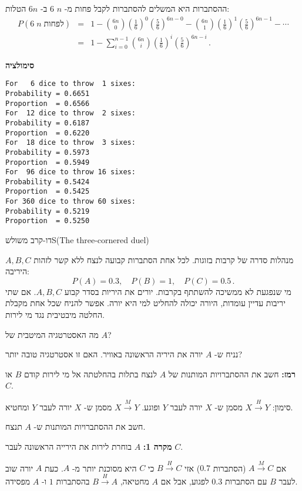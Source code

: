 ההסתברות היא המשלים להסתברות לקבל פחות מ-%
$n$ $6$
ב-%
$6n$
הטלות:
\begin{eqnarray*}
P(6\; n\;\textrm{לפחות})&=&
  1-{6n \choose 0}\left(\frac{1}{6}\right)^0\left(\frac{5}{6}\right)^{6n-0}-
  {6n\choose 1}\left(\frac{1}{6}\right)^{1}\left(\frac{5}{6}\right)^{6n-1}-\cdots\\
&=&1-\sum_{i=0}^{n-1}{6n\choose i}\left(\frac{1}{6}\right)^{i}\left(\frac{5}{6}\right)^{6n-i}\,.
\end{eqnarray*}

\textbf{סימולציה}
\begin{verbatim}
For   6 dice to throw  1 sixes:
Probability = 0.6651
Proportion  = 0.6566
For  12 dice to throw  2 sixes:
Probability = 0.6187
Proportion  = 0.6220
For  18 dice to throw  3 sixes:
Probability = 0.5973
Proportion  = 0.5949
For  96 dice to throw 16 sixes:
Probability = 0.5424
Proportion  = 0.5425
For 360 dice to throw 60 sixes:
Probability = 0.5219
Proportion  = 0.5250
\end{verbatim}



\begin{prob}{דו-קרב משולש}{S}{(The three-cornered duel)}

$A,B,C$
מנהלות סדרה של קרבות בזוגות. לכל אחת הסתברות קבועה לנצח ללא קשר לזהות היריבה:
\[
P(A)=0.3,\quad P(B)=1, \quad P(C)=0.5\,.
\]
מי שנפגעת לא ממשיכה להשתתף בקרבות. יורים את היריות בסדר קבוע 
$A,B,C$.
אם שתי יריבות עדיין עומדות, היורה יכולה להחליט למי היא יורה. אפשר להניח שכל אחת מקבלת החלטה מיבטיבית נגד מי לירות.

מה האסטרטגיה המיטבית של
$A$?

נניח ש-%
$A$
יורה את היריה הראשונה באוויר. האם זו אסטרטגיה טובה יותר?

\textbf{רמז:}
חשב את ההסתברויות המותנות של 
$A$
לנצח בתלות בהחלטתה אל מי לירות קודם
$B$
או
$C$.
\end{prob}

\solution{}

סימון:
$X\stackrel{H}{\longrightarrow}Y$
מסמן ש-%
$X$
יורה לעבר
$Y$
ופוגע.
$X\stackrel{M}{\longrightarrow}Y$
מסמן ש-%
$X$
יורה לעבר
$Y$
ומחטיא.

חשב את ההסתברויות המותנות ש-%
$A$
תנצח.

\textbf{מקרה 1:} 
$A$
בוחרת לירות את הירייה הראשונה לעבר 
$C$.

אם 
$A\stackrel{M}{\longrightarrow}C$
(הסתברות
$0.7$)
אזי
$B\stackrel{H}{\longrightarrow}C$
כי
$C$
היא מסוכנת יותר מ-%
$A$.
כעת
$A$
יורה שוב לעבר 
$B$
עם הסתברות
$0.3$
לפגוע, אבל אם
$A$
מחטיאה,
$B\stackrel{H}{\longrightarrow}A$
בהסתברות
$1$
ו-%
$A$
מפסידה.

